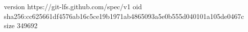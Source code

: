 version https://git-lfs.github.com/spec/v1
oid sha256:cc625661df4576ab16c5ce19b1971ab4865093a5e0b555d040101a105de0467c
size 349692
